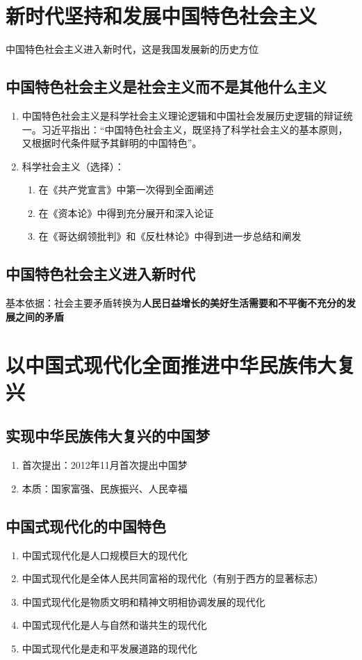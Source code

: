 \documentclass{ctexart}
\numberwithin{figure}{section}
\numberwithin{equation}{section}
\begin{document}
\section{新时代坚持和发展中国特色社会主义}
    中国特色社会主义进入新时代，这是我国发展新的历史方位
    \subsection{中国特色社会主义是社会主义而不是其他什么主义}
        \begin{enumerate}
            \item 中国特色社会主义是科学社会主义理论逻辑和中国社会发展历史逻辑的辩证统一。习近平指出：“中国特色社会主义，既坚持了科学社会主义的基本原则，又根据时代条件赋予其鲜明的中国特色”。
            \item 科学社会主义（选择）：
            \begin{enumerate}
                \item 在《共产党宣言》中第一次得到全面阐述
                \item 在《资本论》中得到充分展开和深入论证
                \item 在《哥达纲领批判》和《反杜林论》中得到进一步总结和阐发
            \end{enumerate}
        \end{enumerate}
    \subsection{中国特色社会主义进入新时代}
        基本依据：社会主要矛盾转换为\textbf{人民日益增长的美好生活需要和不平衡不充分的发展之间的矛盾}
\section{以中国式现代化全面推进中华民族伟大复兴}
    \subsection{实现中华民族伟大复兴的中国梦}
        \begin{enumerate}
            \item 首次提出：2012年11月首次提出中国梦
            \item 本质：国家富强、民族振兴、人民幸福
        \end{enumerate}
    \subsection{中国式现代化的中国特色}
        \begin{enumerate}
            \item 中国式现代化是人口规模巨大的现代化
            \item 中国式现代化是全体人民共同富裕的现代化（有别于西方的显著标志）
            \item 中国式现代化是物质文明和精神文明相协调发展的现代化
            \item 中国式现代化是人与自然和谐共生的现代化
            \item 中国式现代化是走和平发展道路的现代化
        \end{enumerate}
\end{document}
